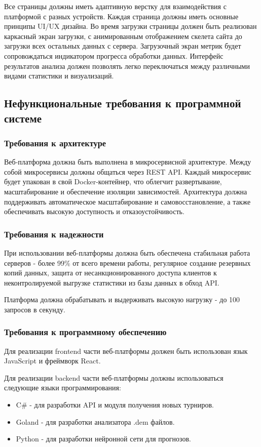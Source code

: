 Все страницы должны иметь адаптивную верстку для взаимодействия с платформой с разных устройств. Каждая страница должны иметь основные принципы UI/UX дизайна.
Во время загрузки страницы должен быть реализован каркасный экран загрузки, с анимированным отображением скелета сайта до загрузки всех остальных данных с сервера. Загрузочный экран метрик будет сопровождаться индикатором прогресса обработки данных. Интерфейс результатов анализа должен позволять легко переключаться между различными видами статистики и визуализаций.

\subsection{Нефункциональные требования к программной системе}
\subsubsection{Требования к архитектуре}
Веб-платформа должна быть выполнена в микросервисной архитектуре. Между собой микросервисы должны общаться через REST API. Каждый микросервис будет упакован в свой Docker-контейнер, что облегчит развертывание, масштабирование и обеспечение изоляции зависимостей. Архитектура должна поддерживать автоматическое масштабирование и самовосстановление, а также обеспечивать высокую доступность и отказоустойчивость.

\subsubsection{Требования к надежности}

При использовании веб-платформы должна быть обеспечена стабильная работа серверов - более 99\% от всего времени работы, регулярное создание резервных копий данных, защита от несанкционированного доступа клиентов к неконтролируемой выгрузке статистики из базы данных в обход API.

Платформа должна обрабатывать и выдерживать высокую нагрузку - до 100 запросов в секунду.

\subsubsection{Требования к программному обеспечению}

Для реализации frontend части веб-платформы должен быть использован язык JavaScript и фреймворк React. 

Для реализации backend части веб-платформы должны использоваться следующие языки программирования: 
\begin{itemize}
	\item C\# - для разработки API и модуля получения новых турниров.
	\item Goland - для разработки анализатора .dem файлов.
	\item Python - для разработки нейронной сети для прогнозов.
\end{itemize}

